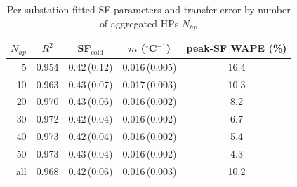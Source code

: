\begin{table}[t]
\centering
\caption{Per-substation fitted SF parameters and transfer error by number of aggregated HPs $N_{hp}$}
\label{tab:sf}
\begin{tabular}{rcccc}
\toprule
$N_{hp}$ & $R^2$ & SF$_{\mathrm{cold}}$ & $m$ ($^\circ$C$^{-1}$) & peak-SF WAPE (\%) \\
\midrule
5 & 0.954 & 0.42\,(0.12) & 0.016\,(0.005) & 16.4 \\
10 & 0.963 & 0.43\,(0.07) & 0.017\,(0.003) & 10.3 \\
20 & 0.970 & 0.43\,(0.06) & 0.016\,(0.002) & 8.2 \\
30 & 0.972 & 0.42\,(0.04) & 0.016\,(0.002) & 6.7 \\
40 & 0.973 & 0.42\,(0.04) & 0.016\,(0.002) & 5.4 \\
50 & 0.973 & 0.43\,(0.04) & 0.016\,(0.002) & 4.3 \\
\midrule
all & 0.968 & 0.42\,(0.06) & 0.016\,(0.003) & 10.2 \\
\bottomrule
\end{tabular}
\end{table}